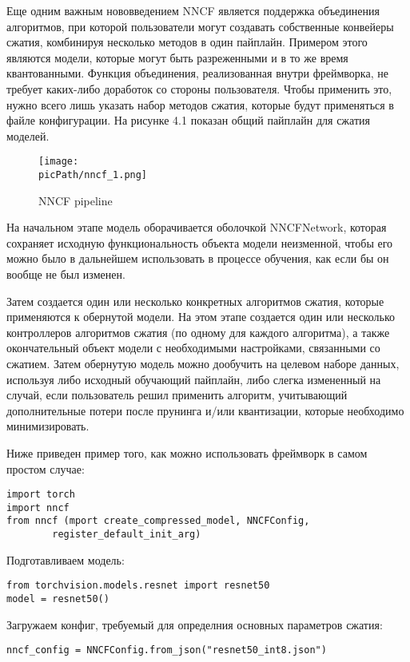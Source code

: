 \documentclass[oneside,final,12pt]{extreport}
\newcommand{\picPath}{images}
\begin{document}
Еще одним важным нововведением NNCF является поддержка объединения алгоритмов, при которой пользователи могут создавать собственные конвейеры сжатия, комбинируя несколько методов в один пайплайн. Примером этого являются модели, которые могут быть разреженными и в то же время квантованными. Функция объединения, реализованная внутри фреймворка, не требует каких-либо доработок со стороны пользователя. Чтобы применить это, нужно всего лишь указать набор методов сжатия, которые будут применяться в файле конфигурации. На рисунке 4.1 показан общий пайплайн для сжатия моделей. 

\begin{figure}[H]
\begin{center}
  \texttt{[image: \\picPath/nncf\_1.png]}
  \caption{NNCF pipeline}
  \label{fig:nncf_1}
 \end{center}
\end{figure}

На начальном этапе модель оборачивается оболочкой NNCFNetwork, которая сохраняет исходную функциональность объекта модели неизменной, чтобы его можно было в дальнейшем использовать в процессе обучения, как если бы он вообще не был изменен.

Затем создается один или несколько конкретных алгоритмов сжатия, которые применяются к обернутой модели. На этом этапе создается один или несколько контроллеров алгоритмов сжатия (по одному для каждого алгоритма), а также окончательный объект модели с необходимыми настройками, связанными со сжатием. Затем обернутую модель можно дообучить на целевом наборе данных, используя либо исходный обучающий пайплайн, либо слегка измененный на случай, если пользователь решил применить алгоритм, учитывающий
дополнительные потери после прунинга и/или квантизации, которые необходимо минимизировать.

Ниже приведен пример того, как можно использовать фреймворк в самом простом случае:

\lstset{language=Python}
\begin{lstlisting}
import torch
import nncf
from nncf (mport create_compressed_model, NNCFConfig, 
        register_default_init_arg)
\end{lstlisting}

Подготавливаем модель:
\begin{lstlisting}
from torchvision.models.resnet import resnet50
model = resnet50()
\end{lstlisting}

Загружаем конфиг, требуемый для определния основных параметров сжатия:
\begin{lstlisting}
nncf_config = NNCFConfig.from_json("resnet50_int8.json")
\end{lstlisting}
\end{document}
